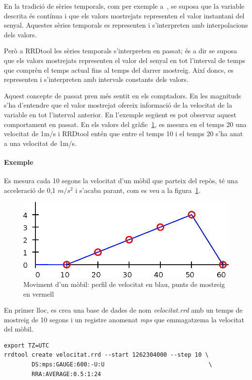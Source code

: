 En la tradició de sèries temporals, com per exemple a~\cite{assfalg08:thesis}, se suposa que la variable descrita és contínua i que els valors mostrejats representen el valor instantani del senyal. Aquestes sèries temporals es representen i s'interpreten amb interpolacions dels valors. 

Però a RRDtool les sèries temporals s'interpreten en passat; és a dir se suposa que els valors mostrejats representen el valor del senyal en tot l'interval de temps que comprèn el temps actual fins al temps del darrer mostreig. Així doncs, es representen i s'interpreten amb intervals constants dels valors.


Aquest concepte de passat pren més sentit en els comptadors. En les magnituds s'ha d'entendre que el valor mostrejat ofereix informació de la velocitat de la variable en tot l'interval anterior. En l'exemple següent es pot observar aquest comportament en passat. En els valors del gràfic~\ref{fig:rrdtool:mostreig_regular}, es mesura en el temps 20 una velocitat de 1m/s i RRDtool entén que entre el temps 10 i el temps 20 s'ha anat a una velocitat de 1m/s.


\paragraph{Exemple} Es mesura cada 10 segons la velocitat d'un mòbil que parteix del repòs, té una acceleració de 0,1 $m/s^2$ i s'acaba parant, com es veu a la figura~\ref{fig:rrdtool:mostreig_regular}. 

\begin{figure}[htp]
  \centering
  \includegraphics[width=\textwidth]{imatges/rrdtool/mostreig_regular.eps}
  \caption{Moviment d'un mòbil: perfil de velocitat en blau, punts de mostreig en vermell}
  \label{fig:rrdtool:mostreig_regular}
\end{figure}

En primer lloc, es crea una base de dades de nom \emph{velocitat.rrd} amb un temps de mostreig de 10 segons i un registre anomenat \emph{mps} que emmagatzema la velocitat del mòbil.
\begin{lstlisting}[style=sh]
export TZ=UTC
rrdtool create velocitat.rrd --start 1262304000 --step 10 \
        DS:mps:GAUGE:600:-U:U                              \ 
        RRA:AVERAGE:0.5:1:24                                                   
\end{lstlisting}


